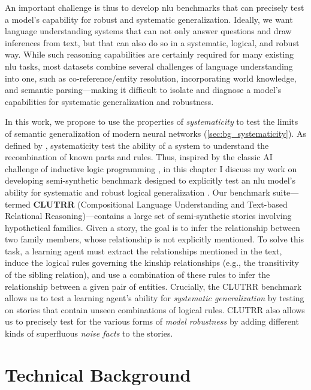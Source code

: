 \documentclass[letterpaper, 12pt]{report}
\begin{document}
An important challenge is thus to develop \acrshort{nlu} benchmarks that can precisely test a model's capability for robust and systematic generalization.
Ideally, we want language understanding systems that can not only answer questions and draw inferences from text, but that can also do so in a systematic, logical, and robust way.
While such reasoning capabilities are certainly required for many existing \acrshort{nlu} tasks, most datasets combine several challenges of language understanding into one, such as co-reference/entity resolution, incorporating world knowledge, and semantic parsing---making it difficult to isolate and diagnose a model's capabilities for systematic generalization and robustness.

In this work, we propose to use the properties of \textit{systematicity} to test the limits of semantic generalization of modern neural networks (\autoref{sec:bg_systematicity}). As defined by \citet{fodor1988connectionism}, systematicity test the ability of a system to understand the recombination of known parts and rules. Thus, inspired by the classic AI challenge of inductive logic programming \citep{Quinlan1990-iv}, in this chapter I discuss my work on developing semi-synthetic benchmark designed to explicitly test an \acrshort{nlu} model's ability for systematic and robust logical generalization \citep{sinha-etal-2019-clutrr}.
Our benchmark suite---termed \textbf{CLUTRR} (Compositional Language Understanding and Text-based Relational Reasoning)---contains a large set of semi-synthetic stories involving hypothetical families.
Given a story, the goal is to infer the relationship between two family members, whose relationship is not explicitly mentioned.
To solve this task, a learning agent must extract the relationships mentioned in the text, induce the logical rules governing the kinship relationships (e.g., the transitivity of the sibling relation), and use a combination of these rules to infer the relationship between a given pair of entities.
Crucially, the CLUTRR benchmark allows us to test a learning agent's ability for \emph{systematic generalization} by testing on stories that contain unseen combinations of logical rules.
CLUTRR also allows us to precisely test for the various forms of \emph{model robustness} by adding different kinds of superfluous \emph{noise facts} to the stories.


\section{Technical Background}
\label{sec:clutrr_bg}
\end{document}
